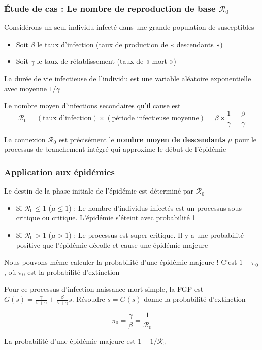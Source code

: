 \documentclass[aspectratio=169]{beamer}\usepackage[]{graphicx}\usepackage[]{xcolor}
\begin{document}
\begin{frame}
    \frametitle{Étude de cas : Le nombre de reproduction de base $\mathcal{R}_0$}

    Considérons un seul individu infecté dans une grande population de susceptibles
    \begin{itemize}
        \item Soit $\beta$ le taux d'infection (taux de production de « descendants »)
        \item Soit $\gamma$ le taux de rétablissement (taux de « mort »)
    \end{itemize}

    La durée de vie infectieuse de l'individu est une variable aléatoire exponentielle avec moyenne $1/\gamma$



    Le nombre moyen d'infections secondaires qu'il cause est
    $$ \mathcal{R}_0 = (\text{taux d'infection}) \times (\text{période infectieuse moyenne}) = \beta \times \frac{1}{\gamma} = \frac{\beta}{\gamma} $$

    \begin{block}{La connexion}
    $\mathcal{R}_0$ est précisément le \textbf{nombre moyen de descendants} $\mu$ pour le processus de branchement intégré qui approxime le début de l'épidémie
    \end{block}
\end{frame}

\begin{frame}
    \frametitle{Application aux épidémies}

    Le destin de la phase initiale de l'épidémie est déterminé par $\mathcal{R}_0$

    \begin{itemize}
        \item Si $\mathcal{R}_0 \le 1$ ($\mu \le 1$) : Le nombre d'individus infectés est un processus sous-critique ou critique. L'épidémie s'éteint avec probabilité 1

        \item Si $\mathcal{R}_0 > 1$ ($\mu > 1$) : Le processus est super-critique. Il y a une probabilité positive que l'épidémie décolle et cause une épidémie majeure
    \end{itemize}



    Nous pouvons même calculer la probabilité d'une épidémie majeure ! C'est $1 - \pi_0$, où $\pi_0$ est la probabilité d'extinction

    Pour ce processus d'infection naissance-mort simple, la FGP est $G(s) = \frac{\gamma}{\beta+\gamma} + \frac{\beta}{\beta+\gamma}s$. Résoudre $s=G(s)$ donne la probabilité d'extinction

    $$ \pi_0 = \frac{\gamma}{\beta} = \frac{1}{\mathcal{R}_0} $$

    La probabilité d'une épidémie majeure est $1 - 1/\mathcal{R}_0$
\end{frame}
\end{document}
